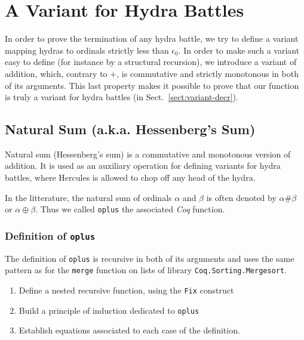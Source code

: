 \section{A Variant for Hydra Battles}

In order to prove the termination of any hydra battle, we try to define a variant mapping hydras to ordinals strictly less than $\epsilon_0$.
In order to make such a variant easy to define (for instance by a structural recursion), we introduce a variant of addition, which, contrary to
$+$, is commutative and strictly monotonous in both of its arguments. This last property makes it possible to prove that our function is 
truly a variant for hydra battles (in Sect.~\vref{sect:variant-decr}).

\subsection{Natural Sum (a.k.a. Hessenberg's  Sum)}
\label{sec:orgheadline87}
\label{hydra-variant}

Natural sum (Hessenberg's  sum) is a commutative and monotonous version of
addition. It is used as an auxiliary operation  for defining variants
for hydra battles, where Hercules is allowed to chop off any  head of the hydra.

In the litterature, the natural sum of ordinals \(\alpha\) and \(\beta\) 
is often denoted by \(\alpha \# \beta\)  or  \(\alpha \oplus  \beta\).
Thus we called \texttt{oplus} the associated \emph{Coq} function.

\subsubsection{Definition of \texttt{oplus}}
\label{sec:orgheadline84}

The definition of \texttt{oplus} is recursive in both of its 
arguments and uses  the same pattern as for the \texttt{merge} function on lists of library
\texttt{Coq.Sorting.Mergesort}.

\begin{enumerate}
\item Define a nested recursive function, using the \texttt{Fix} 
    construct

\item Build a principle of induction dedicated to \texttt{oplus}

\item Establish equations associated to each case of the definition.
\end{enumerate}

